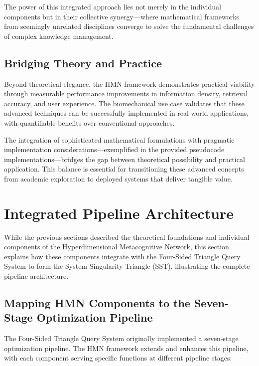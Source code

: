 \documentclass[journal,onecolumn]{IEEEtran}
\begin{document}
The power of this integrated approach lies not merely in the individual components but in their collective synergy—where mathematical frameworks from seemingly unrelated disciplines converge to solve the fundamental challenges of complex knowledge management.

\subsection{Bridging Theory and Practice}

Beyond theoretical elegance, the HMN framework demonstrates practical viability through measurable performance improvements in information density, retrieval accuracy, and user experience. The biomechanical use case validates that these advanced techniques can be successfully implemented in real-world applications, with quantifiable benefits over conventional approaches.

The integration of sophisticated mathematical formulations with pragmatic implementation considerations—exemplified in the provided pseudocode implementations—bridges the gap between theoretical possibility and practical application. This balance is essential for transitioning these advanced concepts from academic exploration to deployed systems that deliver tangible value.

\section{Integrated Pipeline Architecture}

While the previous sections described the theoretical foundations and individual components of the Hyperdimensional Metacognitive Network, this section explains how these components integrate with the Four-Sided Triangle Query System to form the System Singularity Triangle (SST), illustrating the complete pipeline architecture.

\subsection{Mapping HMN Components to the Seven-Stage Optimization Pipeline}

The Four-Sided Triangle Query System originally implemented a seven-stage optimization pipeline. The HMN framework extends and enhances this pipeline, with each component serving specific functions at different pipeline stages:
\end{document}
